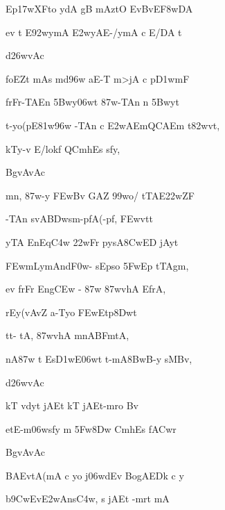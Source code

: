 {\dn Ep\317wXFto ydA gB\0 mAztO EvBv\?E\3F8wDA{\dandabdn} \dontdisplaylinenum}

{\dn ev\2 t\? E\392wymA \3E2w\?yAE-/ymA c E/DA t\? \vegdn\dontdisplaylinenum}

{\dn d\?\326wvAc{\dandabdn}\dontdisplaylinenum }

{\dn foEZt\2 mA\2s m\?d\396w aE-T m>jA c p\3D1wmF{\dandadn} \dontdisplaylinenum}

{\dn frFr-TAEn \35Bwy\306wt\? \387w-TAn\2 n \35Bwyt\? \vegdn\dontdisplaylinenum}

{\dn t-yo(pE\381w\396w -TAn\2 c \3E2wAEmQCAEm t\382wvt,{\dandabdn} \dontdisplaylinenum}

{\dn kTy-v E/lok\?f QC\?mh\0Es s\2fy, \vegdn\dontdisplaylinenum}

{\dn BgvAvAc{\dandabdn}\dontdisplaylinenum }

{\dn mn, \387w-y \3FEwBv\2 G\5AZ\2 \399wo/\2 tTAE\322wZF{\dandadn} \dontdisplaylinenum}

{\dn -TAn\2  svA\0\3BDwsm-pfA\0(-pf\0, \3FEwvt\0t\? \vegdn\dontdisplaylinenum}

{\dn yTA EnEq\3C4w\2 \322wFr\2  pysA\38CwED jAyt\?{\dandabdn} \dontdisplaylinenum}

{\dn \3FEwmLymAnd\3F0w- sEp\0so \35FwEp tTAgm, \vegdn\dontdisplaylinenum}

{\dn ev\2 frFr Eng\0\3CEw\? {\rs -\re} \387w\2 \387wvhA EfrA,{\dandabdn} \dontdisplaylinenum}

{\dn {}rEy(vAv\?{\qvb}Z a-Tyo \3FEwEtp\38Dwt\? \vegdn\dontdisplaylinenum}

{\dn tt- tA, \387wvhA m\?nABFmtA,{\dandabdn} \dontdisplaylinenum}

{\dn nA\387w\2 t Es\3D1wE\306wt t-mA\38BwB\0-y sMBv, \vegdn\dontdisplaylinenum}

{\dn d\?\326wvAc{\dandabdn}\dontdisplaylinenum }

{\dn kT\2 v\?dyt\? jAEt kT\2 jAEt-mro Bv\? \dontdisplaylinenum}

{\dn etE-m\306ws\2fy\2 m\? \35Fw\38Dw C\?mh\0Es f\3ACwr \vegdn\dontdisplaylinenum}

{\dn BgvAvAc{\dandabdn}\dontdisplaylinenum }

{\dn BAEvtA(mA\2 c yo j\306wd\?{\qvb}Ev BogAEDk\2 c y \dontdisplaylinenum}

{\dn b\5\39CwEv\3E2wAns\2\3C4w, s jAEt\2 -mrt\? mA \vegdn\dontdisplaylinenum}

